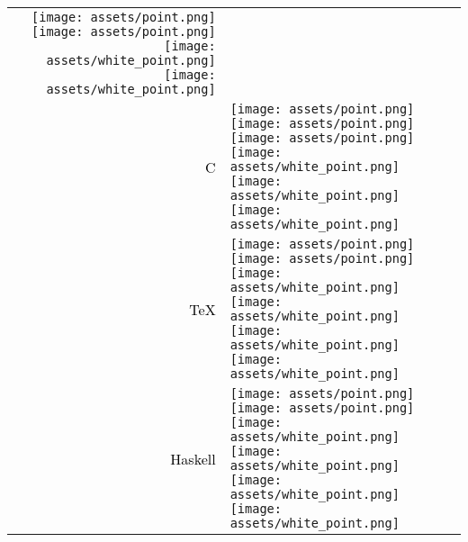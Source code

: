 \documentclass[../main.tex]{subfiles}
\begin{document}
\begin{tabular}{r l}
            \texttt{[image: assets/point.png]}
            \texttt{[image: assets/point.png]}
            \texttt{[image: assets/white\_point.png]}
            \texttt{[image: assets/white\_point.png]}\\
    \textcolor{black}{\vspace*{0.1cm}C} &
            \texttt{[image: assets/point.png]}
            \texttt{[image: assets/point.png]}
            \texttt{[image: assets/point.png]}
            \texttt{[image: assets/white\_point.png]}
            \texttt{[image: assets/white\_point.png]}
            \texttt{[image: assets/white\_point.png]}\\
    \textcolor{black}{\vspace*{0.1cm}TeX} &
            \texttt{[image: assets/point.png]}
            \texttt{[image: assets/point.png]}
            \texttt{[image: assets/white\_point.png]}
            \texttt{[image: assets/white\_point.png]}
            \texttt{[image: assets/white\_point.png]}
            \texttt{[image: assets/white\_point.png]}\\
    \textcolor{black}{\vspace*{0.1cm}Haskell} &
            \texttt{[image: assets/point.png]}
            \texttt{[image: assets/point.png]}
            \texttt{[image: assets/white\_point.png]}
            \texttt{[image: assets/white\_point.png]}
            \texttt{[image: assets/white\_point.png]}
            \texttt{[image: assets/white\_point.png]}\\
    
            
    \end{tabular}
\end{document}
